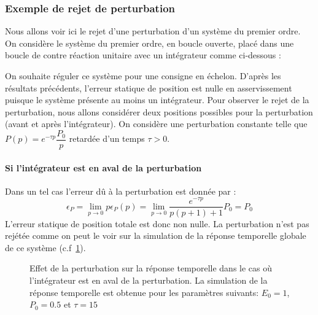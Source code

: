 \subsubsection{Exemple de rejet de perturbation}
Nous allons voir ici le rejet d'une perturbation d'un système du premier ordre. 
On considère le système du premier ordre, en boucle ouverte, placé dans une 
boucle de contre réaction unitaire avec un intégrateur comme ci-dessous :
\begin{center}                           
    
\end{center}                             
On souhaite réguler ce système pour une consigne en échelon.
D'après les résultats précédents, l'erreur statique de position est nulle 
en asservissement puisque le système présente au moins un intégrateur. 
Pour observer le rejet de la perturbation, nous allons considérer 
deux positions possibles pour la perturbation (avant et après 
l'intégrateur). On considère une perturbation constante telle 
que $P(p)=e^{-\tau p}\dfrac{P_0}{p}$ retardée d'un temps $\tau>0$. 
\paragraph{Si l'intégrateur est en aval de la perturbation}
Dans un tel cas l'erreur dû à la perturbation est donnée par :
\[
\epsilon_P=\lim\limits_{p\to0}p\epsilon_P(p)=
\lim\limits_{p\to0}\dfrac{e^{-\tau p}}{p(p+1)+1}P_0=P_0
\]
L'erreur statique de position totale est donc non nulle. La perturbation
n'est pas rejétée comme on peut le voir sur la simulation de la réponse
temporelle globale de ce système (c.f~\cref{fig-pert1}).
\begin{figure}[!h]
    \centering
    
    \caption{Effet de la perturbation sur la réponse temporelle dans le cas
             où l'intégrateur est en aval de la perturbation. La simulation 
             de la réponse temporelle est obtenue pour les paramètres suivants:
             $E_0=1$, $P_0=0.5$ et $\tau=15$\label{fig-pert1}}
\end{figure}
